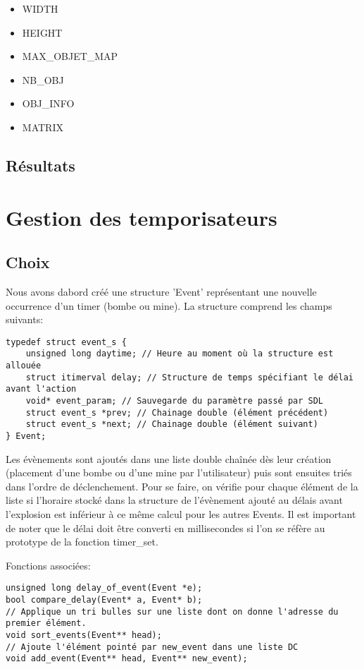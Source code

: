 \documentclass[a4paper]{article}
\begin{document}
\begin{itemize}
\item WIDTH
\item HEIGHT
\item MAX_OBJET_MAP
\item NB_OBJ
\item OBJ_INFO
\item MATRIX
\end{itemize}


\subsection{Résultats}

\section{Gestion des temporisateurs}
\subsection{Choix}
Nous avons dabord créé une structure 'Event' représentant une nouvelle occurrence d'un timer (bombe ou mine). La structure comprend les champs suivants:

\begin{verbatim}
typedef struct event_s {
    unsigned long daytime; // Heure au moment où la structure est allouée
    struct itimerval delay; // Structure de temps spécifiant le délai avant l'action
    void* event_param; // Sauvegarde du paramètre passé par SDL
    struct event_s *prev; // Chainage double (élément précédent)
    struct event_s *next; // Chainage double (élément suivant)
} Event;
\end{verbatim}

Les évènements sont ajoutés dans une liste double chaînée dès leur création (placement d'une bombe ou d'une mine par l'utilisateur) puis sont ensuites triés dans l'ordre de déclenchement. Pour se faire, on vérifie pour chaque élément de la liste si l'horaire stocké dans la structure de l'évènement ajouté au délais avant l'explosion est inférieur à ce même calcul pour les autres Events. Il est important de noter que le délai doit être converti en millisecondes si l'on se réfère au prototype de la fonction timer\_set.

Fonctions associées:
\begin{verbatim}
unsigned long delay_of_event(Event *e);
bool compare_delay(Event* a, Event* b);
// Applique un tri bulles sur une liste dont on donne l'adresse du premier élément.
void sort_events(Event** head);
// Ajoute l'élément pointé par new_event dans une liste DC 
void add_event(Event** head, Event** new_event);
\end{verbatim}
\end{document}
